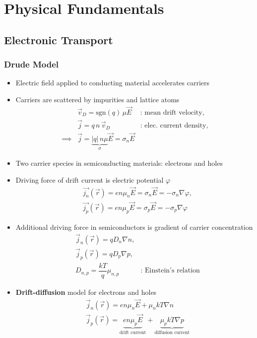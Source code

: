 \section{Physical Fundamentals}
\subsection{Electronic Transport}
\subsubsection{Drude Model}
\begin{itemize}
  \item Electric field applied to conducting material accelerates carriers
  \item Carriers are scattered by impurities and lattice atoms
        \begin{align*}
          &\vec{v}_{D} = \mathrm{sgn}(q) \, \mu \vec{E} &\text{: mean drift velocity},\\
          &\vec{j} = q \, n \, \vec{v}_{D} &\text{: elec. current density},\\
          \implies&\vec{j} = \underbrace{|q|\,n\mu}_{\sigma} \vec{E} = \sigma_{n} \vec{E}
        \end{align*}
  \item Two carrier species in semiconducting materials: electrons and holes
  \item Driving force of drift current is electric potential $\varphi$
        \begin{align*}
          &\vec{j_{n}}(\vec{r}) = en\mu_{n}\vec{E} = \sigma_{n}\vec{E} = -\sigma_{n}\nabla\varphi,\\
          &\vec{j_{p}}(\vec{r}) = en\mu_{p}\vec{E} = \sigma_{p}\vec{E} = -\sigma_{p}\nabla\varphi
        \end{align*}
        \item Additional driving force in semiconductors is gradient of carrier concentration
        \begin{align*}
          &\vec{j}_{n}(\vec{r}) = qD_{n}\nabla n,\\
          &\vec{j}_{p}(\vec{r}) = qD_{p}\nabla p,\\
          &D_{n,p} = \dfrac{kT}{q}\mu_{n,p} & \text{: Einstein's relation}
        \end{align*}
  \item \textbf{Drift-diffusion} model for electrons and holes
        \begin{align*}
          &\vec{j}_{n}(\vec{r}) = en\mu_{n}\vec{E} + \mu_{n}kT\nabla n\\
          &\vec{j}_{p}(\vec{r}) = \underbrace{en\mu_{p}\vec{E}}_{\text{drift current}}
          + \underbrace{\mu_{p}kT\nabla p}_{\text{diffusion current}}
        \end{align*}
\end{itemize}


